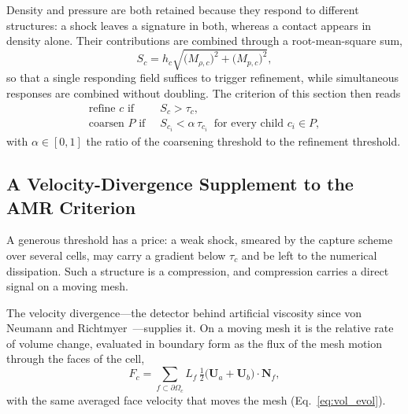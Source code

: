 \documentclass[a4paper]{cas-sc}
\begin{document}
Density and pressure are both retained because they respond to different structures: a shock leaves a signature in both, whereas a contact appears in density alone. Their contributions are combined through a root-mean-square sum,
\begin{equation}
	S_c=h_c\sqrt{\bigl(M_{\rho,c}\bigr)^{2}
		+\bigl(M_{p,c}\bigr)^{2}},
	\label{eq:scw}
\end{equation}
so that a single responding field suffices to trigger refinement, while simultaneous responses are combined without doubling. The criterion of this section then reads
\begin{equation}
	\begin{aligned}
		\text{refine } c \text{ if }\ & S_c>\tau_c,\\
		\text{coarsen } P \text{ if }\ & S_{c_i}<\alpha\,\tau_{c_i}\ \text{ for every child } c_i\in P,
	\end{aligned}
	\label{eq:thermo_criteria}
\end{equation}
with \(\alpha\in[0,1]\) the ratio of the coarsening threshold to the refinement threshold.




\subsection{A Velocity-Divergence Supplement to the AMR Criterion}
\label{sec:indicator_kinematic}
\label{sec:threshold_calibration}

A generous threshold has a price: a weak shock, smeared by the capture scheme over
several cells, may carry a gradient below \(\tau_c\) and be left to the numerical
dissipation. Such a structure is a compression, and compression carries a direct
signal on a moving mesh.

The velocity divergence---the detector behind artificial viscosity since von
Neumann and Richtmyer~\cite{vonneumann1950method}---supplies it. On a moving mesh
it is the relative rate of volume change, evaluated in boundary form as the flux
of the mesh motion through the faces of the cell,
\begin{equation}
	F_c=\sum_{f\subset\partial\Omega_c}L_f\,\tfrac12\bigl(\boldsymbol{U}_a+\boldsymbol{U}_b\bigr)\cdot\boldsymbol{N}_f,
	\label{eq:fk}
\end{equation}
with the same averaged face velocity that moves the mesh
(Eq.~\eqref{eq:vol_evol}).
\end{document}
